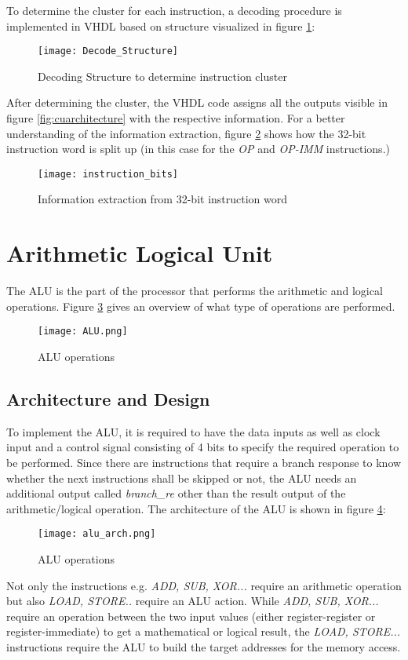 To determine the cluster for each instruction, a decoding procedure is implemented in VHDL based on structure visualized in figure \ref{fig:decode_structure}:

\begin{figure}[H]
	\centering
	\texttt{[image: Decode\_Structure]}
	\caption{Decoding Structure to determine instruction cluster}
	\label{fig:decode_structure}
\end{figure}
After determining the cluster, the VHDL code assigns all the outputs visible in figure \ref{fig:cuarchitecture} with the respective information. For a better understanding of the information extraction, figure \ref{fig:instruction_bits} shows how the 32-bit instruction word is split up (in this case for the \textit{OP} and \textit{OP-IMM} instructions.)
\begin{figure}[H]
	\centering
	\texttt{[image: instruction\_bits]}
	\caption{Information extraction from 32-bit instruction word}
	\label{fig:instruction_bits}
\end{figure}


\section{Arithmetic Logical Unit}
The \acf{ALU} is the part of the processor that performs the arithmetic and logical operations. Figure \ref{fig:alu} gives an overview of what type of operations are performed.
\begin{figure}[H]
	\centering
	\texttt{[image: ALU.png]}
	\caption{ALU operations}
	\label{fig:alu}
\end{figure}

\subsection{Architecture and Design}
To implement the ALU, it is required to have the data inputs as well as clock input and a control signal consisting of 4 bits to specify the required operation to be performed. Since there are instructions that require a branch response to know whether the next instructions shall be skipped or not, the ALU needs an additional output called \textit{branch\_re} other than the result output of the arithmetic/logical operation. The architecture of the ALU is shown in figure \ref{fig:alu_arch}:
\begin{figure}[H]
	\centering
	\texttt{[image: alu\_arch.png]}
	\caption{ALU operations}
	\label{fig:alu_arch}
\end{figure}
Not only the instructions e.g. \textit{ADD, SUB, XOR...} require an arithmetic operation but also \textit{LOAD, STORE..} require an ALU action. While \textit{ADD, SUB, XOR...} require an operation between the two input values (either register-register or register-immediate) to get a mathematical or logical result, the \textit{LOAD, STORE...} instructions require the ALU to build the target addresses for the memory access.
\clearpage
